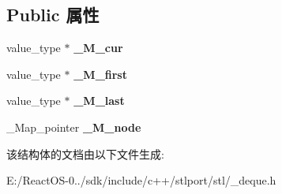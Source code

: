 \subsection*{Public 属性}
\begin{DoxyCompactItemize}
\item 
\mbox{\label{struct___deque__iterator__base_acbca7821a2641fe72633b8c0eca607cb}} 
value\+\_\+type $\ast$ {\bfseries \+\_\+\+M\+\_\+cur}
\item 
\mbox{\label{struct___deque__iterator__base_a57e42c68d4878533c30e6bf0b79e4557}} 
value\+\_\+type $\ast$ {\bfseries \+\_\+\+M\+\_\+first}
\item 
\mbox{\label{struct___deque__iterator__base_acfd53d86f44b34fb81ae27ced3de66b8}} 
value\+\_\+type $\ast$ {\bfseries \+\_\+\+M\+\_\+last}
\item 
\mbox{\label{struct___deque__iterator__base_ae4a424c1b62c8574652f796a4cef0caa}} 
\+\_\+\+Map\+\_\+pointer {\bfseries \+\_\+\+M\+\_\+node}
\end{DoxyCompactItemize}


该结构体的文档由以下文件生成\+:\begin{DoxyCompactItemize}
\item 
E\+:/\+React\+O\+S-\/0../sdk/include/c++/stlport/stl/\+\_\+deque.\+h\end{DoxyCompactItemize}

